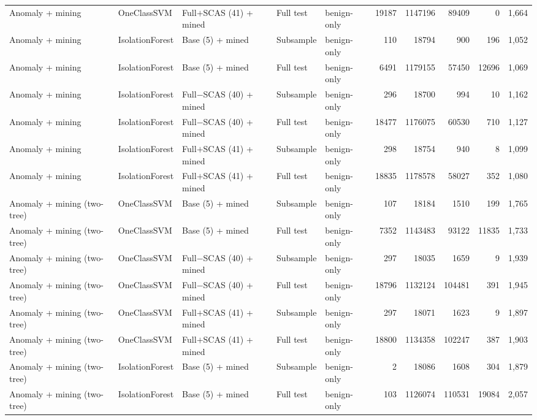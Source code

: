 \begin{longtable}{lllllrrrrr}
\addlinespace
Anomaly + mining & OneClassSVM & Full$+$SCAS (41) + mined & Full test & benign-only & 19187 & 1147196 & 89409 & 0 & 1,664 \\
\addlinespace
Anomaly + mining & IsolationForest & Base (5) + mined & Subsample & benign-only & 110 & 18794 & 900 & 196 & 1,052 \\
\addlinespace
Anomaly + mining & IsolationForest & Base (5) + mined & Full test & benign-only & 6491 & 1179155 & 57450 & 12696 & 1,069 \\
\addlinespace
Anomaly + mining & IsolationForest & Full$-$SCAS (40) + mined & Subsample & benign-only & 296 & 18700 & 994 & 10 & 1,162 \\
\addlinespace
Anomaly + mining & IsolationForest & Full$-$SCAS (40) + mined & Full test & benign-only & 18477 & 1176075 & 60530 & 710 & 1,127 \\
\addlinespace
Anomaly + mining & IsolationForest & Full$+$SCAS (41) + mined & Subsample & benign-only & 298 & 18754 & 940 & 8 & 1,099 \\
\addlinespace
Anomaly + mining & IsolationForest & Full$+$SCAS (41) + mined & Full test & benign-only & 18835 & 1178578 & 58027 & 352 & 1,080 \\
\addlinespace
Anomaly + mining (two-tree) & OneClassSVM & Base (5) + mined & Subsample & benign-only & 107 & 18184 & 1510 & 199 & 1,765 \\
\addlinespace
Anomaly + mining (two-tree) & OneClassSVM & Base (5) + mined & Full test & benign-only & 7352 & 1143483 & 93122 & 11835 & 1,733 \\
\addlinespace
Anomaly + mining (two-tree) & OneClassSVM & Full$-$SCAS (40) + mined & Subsample & benign-only & 297 & 18035 & 1659 & 9 & 1,939 \\
\addlinespace
Anomaly + mining (two-tree) & OneClassSVM & Full$-$SCAS (40) + mined & Full test & benign-only & 18796 & 1132124 & 104481 & 391 & 1,945 \\
\addlinespace
Anomaly + mining (two-tree) & OneClassSVM & Full$+$SCAS (41) + mined & Subsample & benign-only & 297 & 18071 & 1623 & 9 & 1,897 \\
\addlinespace
Anomaly + mining (two-tree) & OneClassSVM & Full$+$SCAS (41) + mined & Full test & benign-only & 18800 & 1134358 & 102247 & 387 & 1,903 \\
\addlinespace
Anomaly + mining (two-tree) & IsolationForest & Base (5) + mined & Subsample & benign-only & 2 & 18086 & 1608 & 304 & 1,879 \\
\addlinespace
Anomaly + mining (two-tree) & IsolationForest & Base (5) + mined & Full test & benign-only & 103 & 1126074 & 110531 & 19084 & 2,057 \\

\end{longtable}

